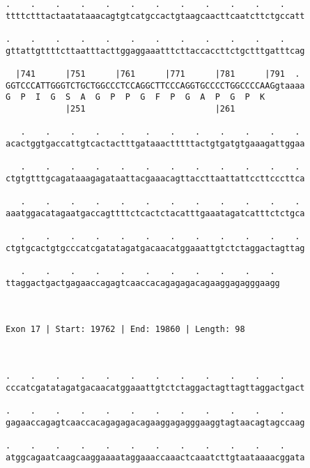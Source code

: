 \documentclass{article}
\begin{document}
\begin{Verbatim}
.    .    .    .    .    .    .    .    .    .    .    .    
ttttctttactaatataaacagtgtcatgccactgtaagcaacttcaatcttctgccatt
                                                            
.    .    .    .    .    .    .    .    .    .    .    .    
gttattgttttcttaatttacttggaggaaatttcttaccaccttctgctttgatttcag
                                                            
  |741      |751      |761      |771      |781      |791  . 
GGTCCCATTGGGTCTGCTGGCCCTCCAGGCTTCCCAGGTGCCCCTGGCCCCAAGgtaaaa
G  P  I  G  S  A  G  P  P  G  F  P  G  A  P  G  P  K        
            |251                          |261              
  
   .    .    .    .    .    .    .    .    .    .    .    . 
acactggtgaccattgtcactactttgataaactttttactgtgatgtgaaagattggaa
                                                            
   .    .    .    .    .    .    .    .    .    .    .    . 
ctgtgtttgcagataaagagataattacgaaacagttaccttaattattccttcccttca
                                                            
   .    .    .    .    .    .    .    .    .    .    .    . 
aaatggacatagaatgaccagttttctcactctacatttgaaatagatcatttctctgca
                                                            
   .    .    .    .    .    .    .    .    .    .    .    . 
ctgtgcactgtgcccatcgatatagatgacaacatggaaattgtctctaggactagttag
                                                            
   .    .    .    .    .    .    .    .    .    .    . 
ttaggactgactgagaaccagagtcaaccacagagagacagaaggagagggaagg
                                                       
                                                       
 
Exon 17 | Start: 19762 | End: 19860 | Length: 98



.    .    .    .    .    .    .    .    .    .    .    .    
cccatcgatatagatgacaacatggaaattgtctctaggactagttagttaggactgact
                                                            
.    .    .    .    .    .    .    .    .    .    .    .    
gagaaccagagtcaaccacagagagacagaaggagagggaaggtagtaacagtagccaag
                                                            
.    .    .    .    .    .    .    .    .    .    .    .    
atggcagaatcaagcaaggaaaataggaaaccaaactcaaatcttgtaataaaacggata
                                                            

\end{Verbatim}
\end{document}
